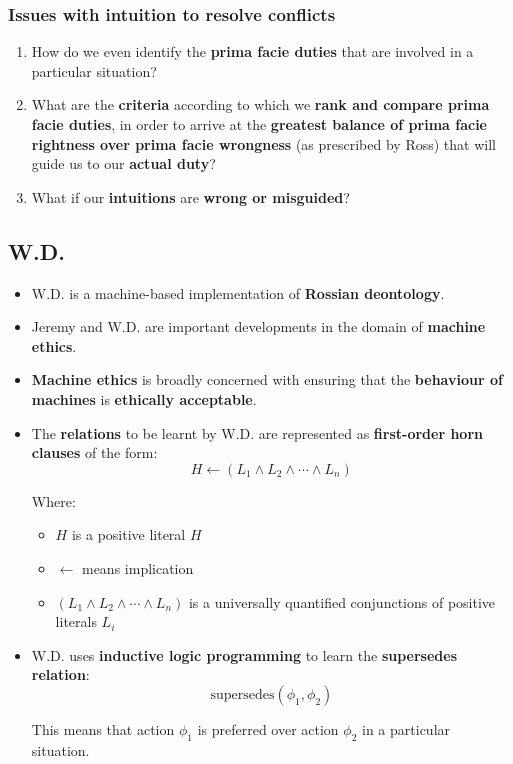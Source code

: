 \documentclass[11pt]{article}
\begin{document}
\subsubsection{Issues with intuition to resolve conflicts}
\label{sec:orgcec9649}
\begin{enumerate}
\item How do we even identify the \textbf{prima facie duties} that are involved in a particular situation?
\item What are the \textbf{criteria} according to which we \textbf{rank and compare prima facie duties}, in order to arrive at the \textbf{greatest balance of prima facie rightness over prima facie wrongness} (as prescribed by Ross) that will guide us to our \textbf{actual duty}?
\item What if our \textbf{intuitions} are \textbf{wrong or misguided}?
\end{enumerate}
\subsection{W.D.}
\label{sec:orgdd8bfe1}
\begin{itemize}
\item W.D. is a machine-based implementation of \textbf{Rossian deontology}.
\item Jeremy and W.D. are important developments in the domain of \textbf{machine ethics}.
\item \textbf{Machine ethics} is broadly concerned with ensuring that the \textbf{behaviour of machines} is \textbf{ethically acceptable}.
\item The \textbf{relations} to be learnt by W.D. are represented as \textbf{first-order horn clauses} of the form:
\[H \leftarrow (L_1 \wedge L_2 \wedge \cdots \wedge L_n)\]

Where:
\begin{itemize}
\item \(H\) is a positive literal \(H\)
\item \(\leftarrow\) means implication
\item \((L_1 \wedge L_2 \wedge \cdots \wedge L_n)\) is a universally quantified conjunctions of positive literals \(L_i\)
\end{itemize}
\item W.D. uses \textbf{inductive logic programming} to learn the \textbf{supersedes relation}:
\[\text{supersedes}(\phi_1, \phi_2)\]

This means that action \(\phi_1\) is preferred over action \(\phi_2\) in a particular situation.
\end{itemize}
\end{document}
